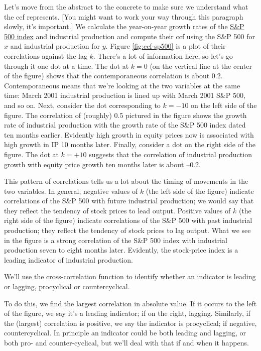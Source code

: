 Let's move from the abstract to the concrete to make sure we
understand what the ccf represents.
[You might want to work your way through this paragraph slowly,
it's important.]
We calculate the year-on-year growth rates of the \href{http://research.stlouisfed.org/fred2/series/SP500}{S\&P 500 index}
and industrial production and compute their ccf using
the S\&P 500 for $x$ and industrial production for $y$.
Figure \ref{fig:ccf-sp500} is a plot of their correlations against
the lag $k$.
There's a lot of information here, so let's go through it
one dot at a time.
The dot at $k=0$ (on the vertical line at the center of the figure)
shows that the contemporaneous correlation is about 0.2.
Contemporaneous means that we're looking at the two variables
at the same time:
March 2001 industrial production is lined up with March 2001 S\&P 500,
and so on.
Next, consider the dot corresponding to $ k = -10$ on the left
side of the figure.
The correlation of (roughly) 0.5 pictured in the figure
shows the growth rate of industrial production with
the growth rate of the S\&P 500 index dated
ten months earlier.
Evidently high growth in equity prices now
is associated with high growth in IP 10 months later.
Finally, consider a dot on the right side of the figure.
The dot at $k=+10$ suggests that the correlation
of industrial production growth with equity price growth ten months
later is about --0.2.

This pattern of correlations tells us a lot about the
timing of movements in the two variables.
In general, negative values of $k$ (the left side of the figure)
indicate correlations of the S\&P 500 with
future industrial production; we would say that they reflect the tendency
of stock prices to lead output.
Positive values of $k$ (the right side of the figure)
indicate correlations of the S\&P 500 with
past industrial production; they reflect
the tendency of stock prices to lag output.
What we see in the figure is a strong correlation of the S\&P 500 index
with industrial production seven to eight months later.
Evidently, the stock-price index is a leading indicator of
industrial production. 

We'll use the cross-correlation function to identify whether
an indicator is leading or lagging, procyclical 
 or   countercyclical.   

To do this, we find the largest correlation in absolute value.
If it occurs to the left of the figure, we say it's a leading indicator;
if on the right, lagging.
Similarly, if the (largest) correlation is positive,
we say the indicator is procyclical;
if negative,   countercyclical.
In principle an indicator could be both leading and lagging,
or both pro- and counter-cyclical,
but we'll deal with that if and when it happens.

